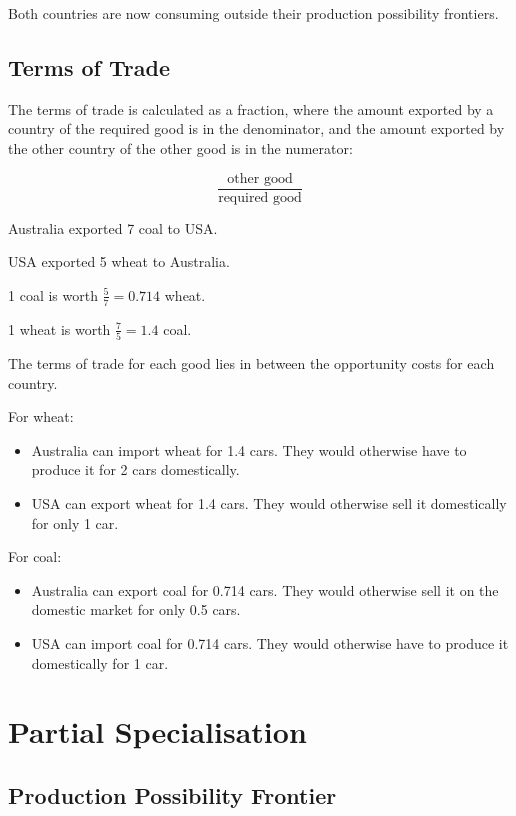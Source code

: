 \documentclass[a4paper,11pt]{article}
\begin{document}
Both countries are now consuming outside their production possibility frontiers.


\subsection{Terms of Trade}

The terms of trade is calculated as a fraction, where the amount exported by a
country of the required good is in the denominator, and the amount exported by
the other country of the other good is in the numerator:

$$
\frac{\text{other good}}{\text{required good}}
$$

Australia exported 7 coal to USA.

USA exported 5 wheat to Australia.

1 coal is worth $\frac{5}{7} = 0.714$ wheat.

1 wheat is worth $\frac{7}{5} = 1.4$ coal.

The terms of trade for each good lies in between the opportunity costs for each
country.

For wheat:

\begin{itemize}
\item Australia can import wheat for 1.4 cars. They would otherwise have to
produce it for 2 cars domestically.
\item USA can export wheat for 1.4 cars. They would otherwise sell it
domestically for only 1 car.
\end{itemize}

For coal:

\begin{itemize}
\item Australia can export coal for 0.714 cars. They would otherwise sell it on
the domestic market for only 0.5 cars.
\item USA can import coal for 0.714 cars. They would otherwise have to produce
it domestically for 1 car.
\end{itemize}




\section{Partial Specialisation}

\subsection{Production Possibility Frontier}
\end{document}
